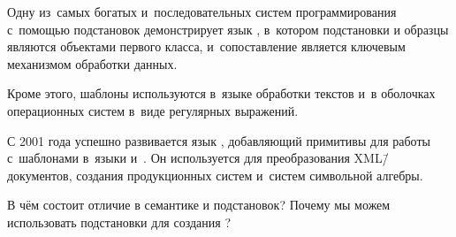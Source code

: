 Одну из~самых богатых и~последовательных систем программирования с~помощью подстановок демонстрирует язык , в~котором подстановки и образцы являются объектами первого класса, и~сопоставление является ключевым механизмом обработки данных.

Кроме этого, шаблоны используются в~языке обработки текстов  и~в оболочках операционных систем в~виде регулярных выражений.

С 2001 года успешно развивается язык , добавляющий примитивы для работы с~шаблонами в~языки  и~. Он используется для преобразования XML\=/документов, создания продукционных систем и~систем символьной алгебры.

\begin{Queeze}
 \item В чём состоит отличие в семантике  и подстановок? Почему мы можем использовать подстановки для создания ?
\end{Queeze}
